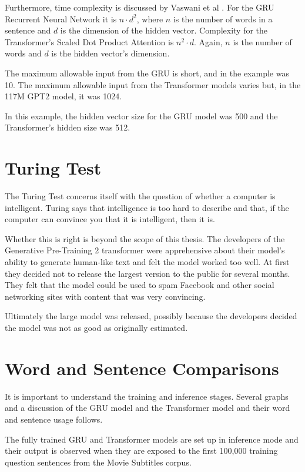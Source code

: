 Furthermore, time complexity is discussed by Vaswani et al \cite{Vaswani2017AttentionIA}. 
For the GRU Recurrent Neural Network it is $ n \cdot d^2 $, where $ n $ is the number of words in a sentence and $ d $ is the dimension of the hidden vector. Complexity for the Transformer's Scaled Dot Product Attention is $ n^2 \cdot  d $. Again, $n$ is the number of words and $d$ is the hidden vector's dimension. 

The maximum allowable input from the GRU is short, and in the example was 10. The maximum allowable input from the Transformer models varies but, in the 117M GPT2 model, it was 1024. 


In this example, the hidden vector size for the GRU model was 500 and %
the Transformer's hidden size was 512.

\section{Turing Test}

The Turing Test concerns itself with the question of whether a computer is intelligent. Turing says that intelligence is too hard to describe and that, if the computer can convince you that it is intelligent, then it is.

Whether this is right is beyond the scope of this thesis. The developers of the Generative Pre-Training 2 transformer were apprehensive about their model's ability to generate human-like text and felt the model worked too well. 
At first they decided not to release the largest version to the public for several months. 
They felt that the model could be used to spam Facebook and other social networking sites with content that was very convincing. 


Ultimately the large model was released, possibly because the developers decided the model was not as good as originally estimated. %

\section{Word and Sentence Comparisons}

It is important to understand the training and inference stages. Several graphs and a discussion of the GRU model and the Transformer model and their word and sentence usage follows.

The fully trained GRU and Transformer models are set up in inference mode and their output is observed when they are exposed to the first 100,000 training question sentences from the Movie Subtitles corpus.

